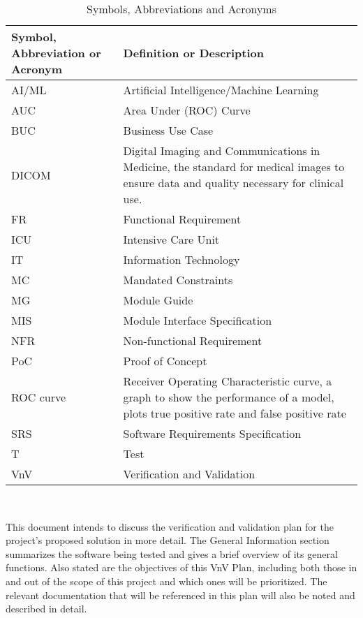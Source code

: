 \documentclass[12pt, titlepage]{article}
\begin{document}
\renewcommand{\arraystretch}{1.2}
\begin{table}[H]
    \centering
    \label{tab:symbsAbbrevsAcros}
    \begin{tabular}{p{1.25in}p{3.75in}}
        \toprule
        \textbf{Symbol, Abbreviation or Acronym} & \textbf{Definition or Description} \\
        \midrule
        AI/ML & Artificial Intelligence/Machine Learning \\
        AUC & Area Under (ROC) Curve \\
        BUC & Business Use Case \\
        DICOM & Digital Imaging and Communications in Medicine, the standard for medical images to ensure data and quality necessary for clinical use.\\
        FR & Functional Requirement \\
        ICU & Intensive Care Unit \\
        IT & Information Technology \\
        MC & Mandated Constraints \\
        MG & Module Guide \\
        MIS & Module Interface Specification \\
        NFR & Non-functional Requirement \\
        PoC & Proof of Concept\\
        ROC curve & Receiver Operating Characteristic curve, a graph to show the performance of a model, plots true positive rate and false positive rate \\
        SRS & Software Requirements Specification \\
        T & Test \\
        VnV & Verification and Validation \\
        \bottomrule
    \end{tabular}\\
    \caption{Symbols, Abbreviations and Acronyms}
\end{table}

\newpage


\noindent This document intends to discuss the verification and validation plan for the project's proposed solution in more detail. The General Information section summarizes the software being tested and gives a brief overview of its general functions. Also stated are the objectives of this VnV Plan, including both those in and out of the scope of this project and which ones will be prioritized. The relevant documentation that will be referenced in this plan will also be noted and described in detail.
\end{document}

